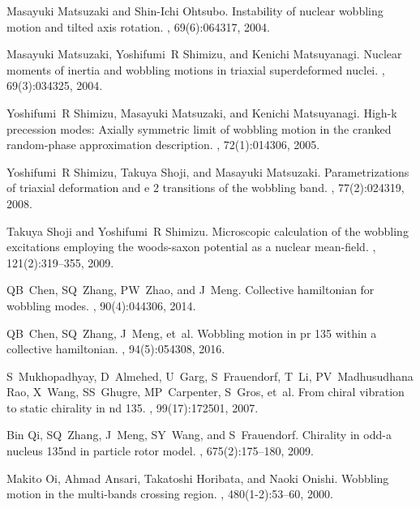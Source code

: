 \documentclass[11pt]{article}
\begin{document}
\begin{thebibliography}{99}
Masayuki Matsuzaki and Shin-Ichi Ohtsubo.
\newblock Instability of nuclear wobbling motion and tilted axis rotation.
, 69(6):064317, 2004.

Masayuki Matsuzaki, Yoshifumi~R Shimizu, and Kenichi Matsuyanagi.
\newblock Nuclear moments of inertia and wobbling motions in triaxial
  superdeformed nuclei.
, 69(3):034325, 2004.

Yoshifumi~R Shimizu, Masayuki Matsuzaki, and Kenichi Matsuyanagi.
\newblock High-k precession modes: Axially symmetric limit of wobbling motion
  in the cranked random-phase approximation description.
, 72(1):014306, 2005.

Yoshifumi~R Shimizu, Takuya Shoji, and Masayuki Matsuzaki.
\newblock Parametrizations of triaxial deformation and e 2 transitions of the
  wobbling band.
, 77(2):024319, 2008.

Takuya Shoji and Yoshifumi~R Shimizu.
\newblock Microscopic calculation of the wobbling excitations employing the
  woods-saxon potential as a nuclear mean-field.
, 121(2):319--355, 2009.

QB~Chen, SQ~Zhang, PW~Zhao, and J~Meng.
\newblock Collective hamiltonian for wobbling modes.
, 90(4):044306, 2014.

QB~Chen, SQ~Zhang, J~Meng, et~al.
\newblock Wobbling motion in pr 135 within a collective hamiltonian.
, 94(5):054308, 2016.

S~Mukhopadhyay, D~Almehed, U~Garg, S~Frauendorf, T~Li, PV~Madhusudhana Rao,
  X~Wang, SS~Ghugre, MP~Carpenter, S~Gros, et~al.
\newblock From chiral vibration to static chirality in nd 135.
, 99(17):172501, 2007.

Bin Qi, SQ~Zhang, J~Meng, SY~Wang, and S~Frauendorf.
\newblock Chirality in odd-a nucleus 135nd in particle rotor model.
, 675(2):175--180, 2009.

Makito Oi, Ahmad Ansari, Takatoshi Horibata, and Naoki Onishi.
\newblock Wobbling motion in the multi-bands crossing region.
, 480(1-2):53--60, 2000.


\end{thebibliography}
\end{document}
